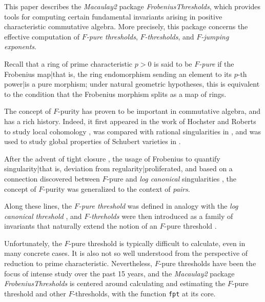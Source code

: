 \documentclass{amsart}
\begin{document}
This paper describes the \emph{Macaulay2} \cite{M2} package \emph{FrobeniusThresholds}, which provides tools for computing certain fundamental invariants arising in positive characteristic commutative algebra.  More precisely, this package concerns the effective computation of \emph{$F$-pure thresholds}, \emph{$F$-thresholds}, and \emph{$F$-jumping exponents}.

Recall that a ring of prime characteristic $p>0$ is said to be \emph{$F$-pure} if the Frobenius map|that is, the ring endomorphism sending an element to its $p$-th power|is a pure morphism;  under natural geometric hypotheses, this is equivalent to the condition that the Frobenius morphism splits as a map of rings.

The concept of $F$-purity has proven to be important in commutative algebra, and has a rich history.  Indeed, it first appeared in the work \cite{HochsterRobertsFrobeniusLocalCohomology}  of Hochster and Roberts to study local cohomology \cite{HochsterRobertsFrobeniusLocalCohomology}, was compared with rational singularities in  \cite{FedderFPureRat}, and was used to study global properties of Schubert varieties in \cite{MehtaRamanathanFrobeniusSplittingAndCohomologyVanishing}.

After the advent of tight closure \cite{HochsterHunekeTC1}, the usage of Frobenius to quantify singularity|that is, deviation from regularity|proliferated, and based on a connection discovered between $F$-pure and \emph{log canonical} singularities \cite{HaraWatanabeFRegFPure}, the concept of $F$-purity was generalized to the context of \emph{pairs}.

Along these lines, the \emph{$F$-pure threshold} %
was defined in analogy with the \emph{log canonical threshold} \cite{TakagiWatanabeFPureThresh}, and
\emph{$F$-threholds} were then introduced as a family of invariants that naturally extend the notion of an $F$-pure threshold \cite{MustataTakagiWatanabeFThresholdsAndBernsteinSato}.

Unfortunately, the $F$-pure threshold is typically difficult to calculate, even in many concrete cases.   It is also not so well understood from the perspective of reduction to prime characteristic.   Nevertheless, $F$-pure thresholds have been the focus of intense study over the past 15 years, and the \emph{Macaulay2} package \emph{FrobeniusThresholds} is centered around calculating and estimating the $F$-pure threshold and other $F$-thresholds, with the function {\tt fpt} at its core.
\end{document}
